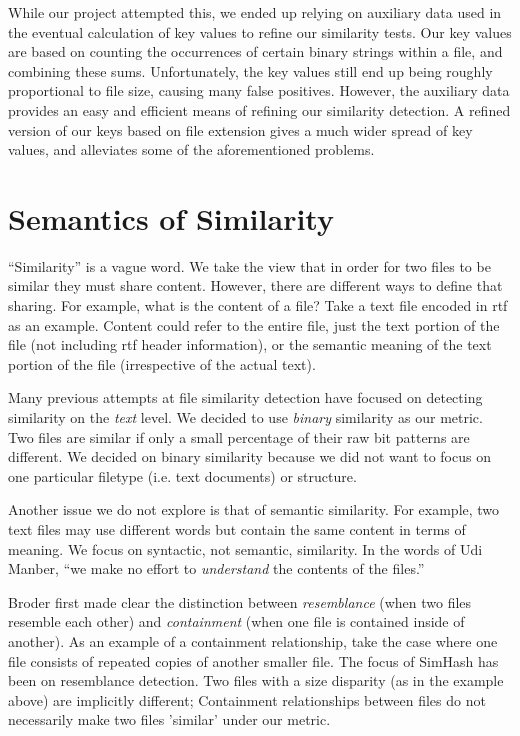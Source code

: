 \documentclass[10pt, twocolumn]{article}
\begin{document}
While our project attempted this, we ended up relying on auxiliary data used in the eventual calculation of key values to refine our similarity tests.  Our key values are based on counting the occurrences of certain binary strings within a file, and combining these sums.  Unfortunately, the key values still end up being roughly proportional to file size, causing many false positives.  However, the auxiliary data provides an easy and efficient means of refining our similarity detection.  A refined version of our keys based on file extension gives a much wider spread of key values, and alleviates some of the aforementioned problems.

\section{Semantics of Similarity}

``Similarity'' is a vague word. We take the view that in order for two files to be similar they must share content. However, there are different ways to define that sharing. For example, what is the content of a file? Take a text file encoded in rtf as an example. Content could refer to the entire file, just the text portion of the file (not including rtf header information), or the semantic meaning of the text portion of the file (irrespective of the actual text). 

Many previous attempts at file similarity detection have focused on detecting similarity on the \emph{text} \cite{hpDocRepositories, hoad} level. We decided to use \emph{binary} similarity as our metric. Two files are similar if only a small percentage of their raw bit patterns are different. We decided on binary similarity because we did not want to focus on one particular filetype (i.e. text documents) or structure. 

Another issue we do not explore is that of semantic similarity. For example, two text files may use different words but contain the same content in terms of meaning. We focus on syntactic, not semantic, similarity. In the words of Udi Manber, ``we make no effort to \emph{understand} the contents of the files.'' \cite{manber}

Broder \cite{broder} first made clear the distinction between \emph{resemblance} (when two files resemble each other) and \emph{containment} (when one file is contained inside of another). As an example of a containment relationship, take the case where one file consists of repeated copies of another smaller file. The focus of SimHash has been on resemblance detection. Two files with a size disparity (as in the example above) are implicitly different; Containment relationships between files do not necessarily make two files 'similar' under our metric.
\end{document}

